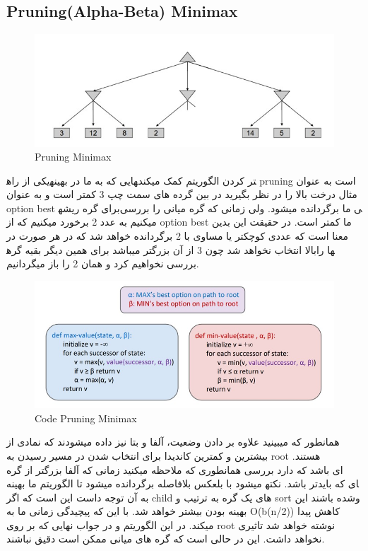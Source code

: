 \subsection{Pruning(Alpha-Beta) Minimax}

\begin{figure}[h!]
    \centering
    \includegraphics[width=0.8\linewidth]{images/pruning01.jpg}
    \caption{Pruning Minimax}
\end{figure}

یکی از راه‎هایی که به ما در بهینه‏‎تر کردن الگوریتم کمک میکند pruning است به عنوان مثال درخت بالا را در نظر بگیرید در بین گرده های سمت چپ 3 کمتر است و به عنوان option best برای گره ریشه‎ی ما برگردانده میشود. ولی زمانی که گره میانی را بررسی میکنیم به عدد 2 برخورد میکنیم که از option best ما کمتر است. در حقیقت این بدین معنا است که عددی کوچکتر یا مساوی با 2 برگردانده خواهد شد که در هر صورت در بالا انتخاب نخواهد شد چون 3 از آن بزرگتر میباشد برای همین دیگر بقیه گره‎ها را بررسی نخواهیم کرد و همان 2 را باز میگردانیم.


\begin{figure}[h!]
    \centering
    \includegraphics[width=0.8\linewidth]{images/pruning02.jpg}
    \caption{Code Pruning Minimax}
\end{figure}

همانطور که میبینید علاوه بر دادن وضعیت، آلفا و بتا نیز داده میشودند که نمادی از بیشترین و کمترین کاندیدا برای انتخاب شدن در مسیر رسیدن به root هستند.  همانطوری که ملاحظه میکنید زمانی که آلفا بزرگتر از گره‎ ای باشد که دارد بررسی میشود با بلعکس بلافاصله برگردانده میشود تا الگوریتم ما بهینه‎ تر باشد.
 نکته‎ای که باید به آن توجه داست این است که اگر child های یک گره به ترتیب و sort وشده باشند این بهینه بودن بیشتر خواهد شد. با این که پیچیدگی زمانی ما به O(b(n/2)) کاهش پیدا میکند. 
در این الگوریتم و در جواب نهایی که بر روی root نوشته خواهد شد تاثیری نخواهد داشت. این در حالی است که گره های میانی ممکن است دقیق نباشند.


